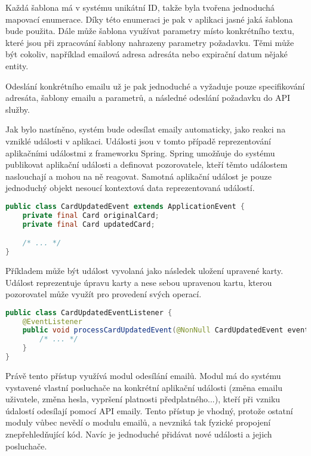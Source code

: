 		Každá šablona má v systému unikátní ID, takže byla tvořena jednoduchá mapovací enumerace.
		Díky této enumeraci je pak v aplikaci jasné jaká šablona bude použita.
		Dále může šablona využívat parametry místo konkrétního textu, které jsou při zpracování šablony nahrazeny
		parametry požadavku.
		Těmi může být cokoliv, například emailová adresa adresáta nebo expirační datum nějaké entity.

		Odeslání konkrétního emailu už je pak jednoduché a vyžaduje pouze specifikování adresáta,
		šablony emailu a parametrů, a následné odeslání požadavku do \ac{API} služby.

		Jak bylo nastíněno, systém bude odesílat emaily automaticky, jako reakci na vzniklé události v aplikaci.
		Události jsou v tomto případě reprezentování aplikačními událostmi z frameworku Spring.
		Spring umožňuje do systému publikovat aplikační události a definovat pozorovatele, kteří těmto událostem
		naslouchají a mohou na ně reagovat.
		Samotná aplikační událost je pouze jednoduchý objekt nesoucí kontextová data reprezentovaná událostí.

		\begin{lstlisting}[language=Java, caption={Ukázka aplikační události. Zdroj: [autor]}]
public class CardUpdatedEvent extends ApplicationEvent {
    private final Card originalCard;
    private final Card updatedCard;

    /* ... */
}
		\end{lstlisting}

		Příkladem může být událost vyvolaná jako následek uložení upravené karty.
		Událost reprezentuje úpravu karty a nese sebou upravenou kartu, kterou pozorovatel může
		využít pro provedení svých operací.

		\begin{lstlisting}[language=Java, caption={Ukázka pozorovatele aplikačních událostí. Zdroj: [autor]}]
public class CardUpdatedEventListener {
    @EventListener
    public void processCardUpdatedEvent(@NonNull CardUpdatedEvent event) {
        /* ... */
    }
}
		\end{lstlisting}

		Právě tento přístup využívá modul odesílání emailů.
		Modul má do systému vystavené vlastní posluchače na konkrétní aplikační události (změna emailu uživatele, změna hesla,
		vypršení platnosti předplatného...), kteří při vzniku údalostí odesílají pomocí \ac{API} emaily.
		Tento přístup je vhodný, protože ostatní moduly vůbec nevědí o modulu emailů, a nevzniká
		tak fyzické propojení znepřehledňující kód.
		Navíc je jednoduché přidávat nové události a jejich posluchače.

